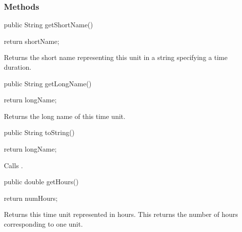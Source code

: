 \subsubsection* {Methods}
\begin{code}

   public String getShortName()\begin{hide} {
      return shortName;
   }\end{hide}
\end{code}
\begin{tabb}   Returns the short name representing this unit in
 a string specifying a time duration.
\end{tabb}
\begin{htmlonly}
\end{htmlonly}
\begin{code}

   public String getLongName()\begin{hide} {
      return longName;
   }\end{hide}
\end{code}
\begin{tabb}   Returns the long name of this time unit.
\end{tabb}
\begin{htmlonly}
\end{htmlonly}
\begin{code}

   public String toString()\begin{hide} {
      return longName;
   }\end{hide}
\end{code}
\begin{tabb}   Calls .
\end{tabb}
\begin{htmlonly}
\end{htmlonly}
\begin{code}

   public double getHours()\begin{hide} {
      return numHours;
   }\end{hide}
\end{code}
\begin{tabb}   Returns this time unit represented in hours.
 This returns the number of hours corresponding to
 one unit.
\end{tabb}
\begin{htmlonly}
\end{htmlonly}
